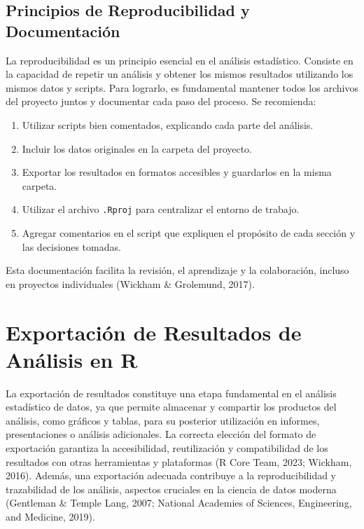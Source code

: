 \documentclass[
  spanish,
  a4paper,
  DIV=11,
  numbers=noendperiod,
  onepage,
  openany]{scrreprt}
\begin{document}
\section{Principios de Reproducibilidad y
Documentación}\label{principios-de-reproducibilidad-y-documentaciuxf3n}

La reproducibilidad es un principio esencial en el análisis estadístico.
Consiste en la capacidad de repetir un análisis y obtener los mismos
resultados utilizando los mismos datos y scripts. Para lograrlo, es
fundamental mantener todos los archivos del proyecto juntos y documentar
cada paso del proceso. Se recomienda:

\begin{enumerate}
\def\labelenumi{\arabic{enumi}.}
\item
  Utilizar scripts bien comentados, explicando cada parte del análisis.
\item
  Incluir los datos originales en la carpeta del proyecto.
\item
  Exportar los resultados en formatos accesibles y guardarlos en la
  misma carpeta.
\item
  Utilizar el archivo \texttt{.Rproj} para centralizar el entorno de
  trabajo.
\item
  Agregar comentarios en el script que expliquen el propósito de cada
  sección y las decisiones tomadas.
\end{enumerate}

Esta documentación facilita la revisión, el aprendizaje y la
colaboración, incluso en proyectos individuales (Wickham \& Grolemund,
2017).


\chapter{Exportación de Resultados de Análisis en
R}\label{exportaciuxf3n-de-resultados-de-anuxe1lisis-en-r}

La exportación de resultados constituye una etapa fundamental en el
análisis estadístico de datos, ya que permite almacenar y compartir los
productos del análisis, como gráficos y tablas, para su posterior
utilización en informes, presentaciones o análisis adicionales. La
correcta elección del formato de exportación garantiza la accesibilidad,
reutilización y compatibilidad de los resultados con otras herramientas
y plataformas (R Core Team, 2023; Wickham, 2016). Además, una
exportación adecuada contribuye a la reproducibilidad y trazabilidad de
los análisis, aspectos cruciales en la ciencia de datos moderna
(Gentleman \& Temple Lang, 2007; National Academies of Sciences,
Engineering, and Medicine, 2019).
\end{document}
